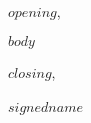 \documentclass[$fontsize$,letterpaper]{letter}
\begin{document}
\begin{letter}{}
\pagestyle{empty}

\opening{$opening$,}

$body$

\closing{$closing$,\\
\\
$signedname$
}

\end{letter}
\end{document}
